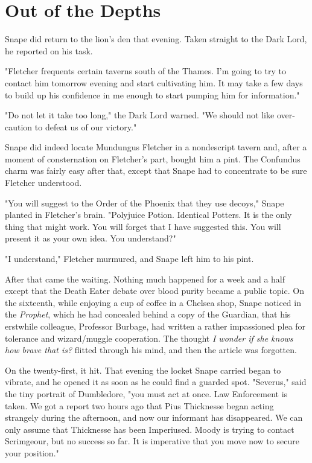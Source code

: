 
\chapter{Out of the Depths}

Snape did return to the lion's den that evening. Taken straight to the Dark Lord, he reported on his task.

"Fletcher frequents certain taverns south of the Thames. I'm going to try to contact him tomorrow evening and start cultivating him. It may take a few days to build up his confidence in me enough to start pumping him for information."

"Do not let it take too long," the Dark Lord warned. "We should not like over-caution to defeat us of our victory."

Snape did indeed locate Mundungus Fletcher in a nondescript tavern and, after a moment of consternation on Fletcher's part, bought him a pint. The Confundus charm was fairly easy after that, except that Snape had to concentrate to be sure Fletcher understood.

"You will suggest to the Order of the Phoenix that they use decoys," Snape planted in Fletcher's brain. "Polyjuice Potion. Identical Potters. It is the only thing that might work. You will forget that I have suggested this. You will present it as your own idea. You understand?"

"I understand," Fletcher murmured, and Snape left him to his pint.

After that came the waiting. Nothing much happened for a week and a half except that the Death Eater debate over blood purity became a public topic. On the sixteenth, while enjoying a cup of coffee in a Chelsea shop, Snape noticed in the \emph{Prophet}, which he had concealed behind a copy of the Guardian, that his erstwhile colleague, Professor Burbage, had written a rather impassioned plea for tolerance and wizard\slash muggle cooperation. The thought \emph{I wonder if she knows how brave that is?} flitted through his mind, and then the article was forgotten.

On the twenty-first, it hit. That evening the locket Snape carried began to vibrate, and he opened it as soon as he could find a guarded spot. "Severus," said the tiny portrait of Dumbledore, "you must act at once. Law Enforcement is taken. We got a report two hours ago that Pius Thicknesse began acting strangely during the afternoon, and now our informant has disappeared. We can only assume that Thicknesse has been Imperiused. Moody is trying to contact Scrimgeour, but no success so far. It is imperative that you move now to secure your position."

